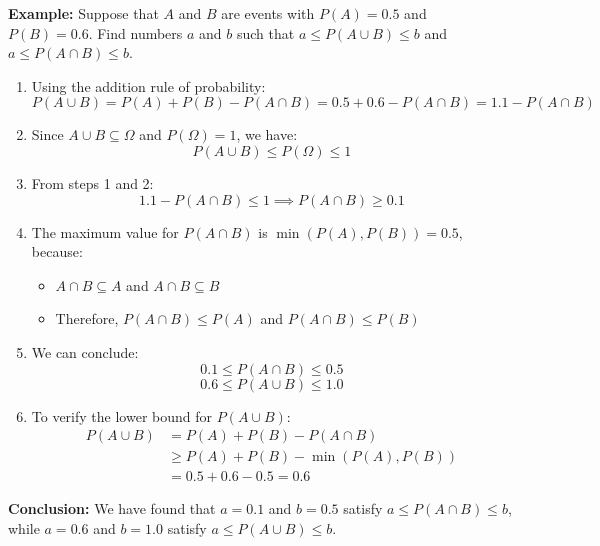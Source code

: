 \documentclass{article}
\begin{document}
\textbf{Example:} Suppose that $A$ and $B$ are events with $P(A) = 0.5$ and $P(B) = 0.6$. Find numbers $a$ and $b$ such that $a \leq P(A \cup B) \leq b$ and $a \leq P(A \cap B) \leq b$.

\begin{enumerate}
    \item Using the addition rule of probability:
        \[P(A \cup B) = P(A) + P(B) - P(A \cap B) = 0.5 + 0.6 - P(A \cap B) = 1.1 - P(A \cap B)\]
    
    \item Since $A \cup B \subseteq \Omega$ and $P(\Omega) = 1$, we have:
        \[P(A \cup B) \leq P(\Omega) \leq 1\]
    
    \item From steps 1 and 2:
        \[1.1 - P(A \cap B) \leq 1 \implies P(A \cap B) \geq 0.1\]
    
    \item The maximum value for $P(A \cap B)$ is $\min(P(A), P(B)) = 0.5$, because:
        \begin{itemize}
            \item $A \cap B \subseteq A$ and $A \cap B \subseteq B$
            \item Therefore, $P(A \cap B) \leq P(A)$ and $P(A \cap B) \leq P(B)$
        \end{itemize}
    
    \item We can conclude:
        \[0.1 \leq P(A \cap B) \leq 0.5\]
        \[0.6 \leq P(A \cup B) \leq 1.0\]
    
    \item To verify the lower bound for $P(A \cup B)$:
        \begin{align*}
            P(A \cup B) &= P(A) + P(B) - P(A \cap B) \\
                        &\geq P(A) + P(B) - \min(P(A), P(B)) \\
                        &= 0.5 + 0.6 - 0.5 = 0.6
        \end{align*}
\end{enumerate}

\textbf{Conclusion:} We have found that $a = 0.1$ and $b = 0.5$ satisfy $a \leq P(A \cap B) \leq b$, while $a = 0.6$ and $b = 1.0$ satisfy $a \leq P(A \cup B) \leq b$.
\end{document}
